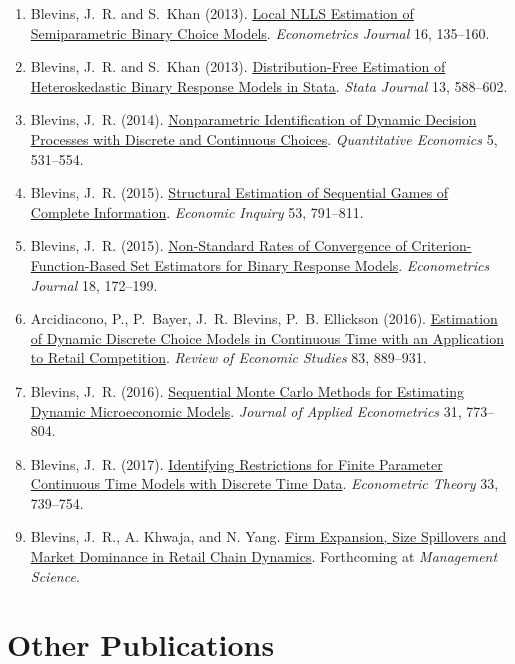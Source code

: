 \documentclass[10pt,letterpaper]{article}
\begin{document}
\begin{enumerate}
\item Blevins, J.~R. and S.~Khan (2013).
  \href{http://jblevins.org/research/lnlls}{Local NLLS Estimation of Semiparametric Binary Choice Models}.
  \textit{Econometrics Journal} 16, 135--160.
\item Blevins, J.~R. and S.~Khan (2013).
  \href{http://jblevins.org/research/dfbr/}{Distribution-Free Estimation of Heteroskedastic Binary Response Models in Stata}.
  \textit{Stata Journal} 13, 588--602.
\item Blevins, J.~R. (2014).
  \href{http://jblevins.org/research/dcident}{Nonparametric Identification of Dynamic Decision Processes with Discrete and Continuous Choices}.
  \textit{Quantitative Economics} 5, 531--554.
\item Blevins, J.~R. (2015).
  \href{http://jblevins.org/research/seqgame}{Structural Estimation of Sequential Games of Complete Information}.
  \textit{Economic Inquiry} 53, 791--811.
\item Blevins, J.~R. (2015).
  \href{http://jblevins.org/research/cuberoot}{Non-Standard Rates of Convergence of Criterion-Function-Based Set Estimators for Binary Response Models}.
  \textit{Econometrics Journal} 18, 172--199.
\item Arcidiacono, P., P.~Bayer, J.~R. Blevins, P.~B. Ellickson (2016).
  \href{http://jblevins.org/research/abbe}{Estimation of Dynamic Discrete Choice Models in Continuous Time with an Application to Retail Competition}.
  \textit{Review of Economic Studies} 83, 889--931.
\item Blevins, J.~R. (2016).
  \href{http://jblevins.org/research/smcdmm}{Sequential Monte Carlo Methods for Estimating Dynamic Microeconomic Models}.
  \textit{Journal of Applied Econometrics} 31, 773--804.
\item Blevins, J.~R. (2017).
  \href{http://jblevins.org/research/sde}{Identifying Restrictions for Finite Parameter Continuous Time Models with Discrete Time Data}.
  \textit{Econometric Theory} 33, 739--754.
\item Blevins, J.~R., A. Khwaja, and N. Yang.
  \href{http://jblevins.org/research/bky}{Firm Expansion, Size Spillovers and Market Dominance in Retail Chain Dynamics}.
  Forthcoming at \textit{Management Science}.
\end{enumerate}

\section*{Other Publications}
\end{document}
